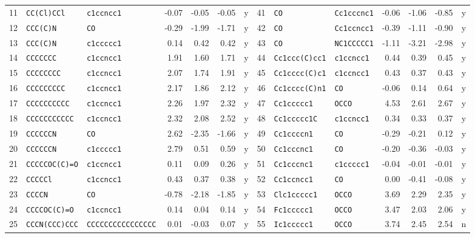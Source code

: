 \begin{table}[t]
{\begin{tabular}{@{}rllrrrc@{\hspace{1.2em}}rllrrrc@{}}
11 & \texttt{CC(Cl)CCl} & \texttt{c1ccncc1} & -0.07 & -0.05 & -0.05 & y & 41 & \texttt{CO} & \texttt{Cc1cccnc1} & -0.06 & -1.06 & -0.85 & y \\
12 & \texttt{CCC(C)N} & \texttt{CO} & -0.29 & -1.99 & -1.71 & y & 42 & \texttt{CO} & \texttt{Cc1ccncc1} & -0.39 & -1.11 & -0.90 & y \\
13 & \texttt{CCC(C)N} & \texttt{c1ccccc1} & 0.14 & 0.42 & 0.42 & y & 43 & \texttt{CO} & \texttt{NC1CCCCC1} & -1.11 & -3.21 & -2.98 & y \\
14 & \texttt{CCCCCCC} & \texttt{c1ccncc1} & 1.91 & 1.60 & 1.71 & y & 44 & \texttt{Cc1ccc(C)cc1} & \texttt{c1ccncc1} & 0.44 & 0.39 & 0.45 & y \\
15 & \texttt{CCCCCCCC} & \texttt{c1ccncc1} & 2.07 & 1.74 & 1.91 & y & 45 & \texttt{Cc1cccc(C)c1} & \texttt{c1ccncc1} & 0.43 & 0.37 & 0.43 & y \\
16 & \texttt{CCCCCCCCC} & \texttt{c1ccncc1} & 2.17 & 1.86 & 2.12 & y & 46 & \texttt{Cc1cccc(C)n1} & \texttt{CO} & -0.06 & 0.14 & 0.64 & y \\
17 & \texttt{CCCCCCCCCC} & \texttt{c1ccncc1} & 2.26 & 1.97 & 2.32 & y & 47 & \texttt{Cc1ccccc1} & \texttt{OCCO} & 4.53 & 2.61 & 2.67 & y \\
18 & \texttt{CCCCCCCCCCC} & \texttt{c1ccncc1} & 2.32 & 2.08 & 2.52 & y & 48 & \texttt{Cc1ccccc1C} & \texttt{c1ccncc1} & 0.34 & 0.33 & 0.37 & y \\
19 & \texttt{CCCCCCN} & \texttt{CO} & 2.62 & -2.35 & -1.66 & y & 49 & \texttt{Cc1ccccn1} & \texttt{CO} & -0.29 & -0.21 & 0.12 & y \\
20 & \texttt{CCCCCCN} & \texttt{c1ccccc1} & 2.79 & 0.51 & 0.59 & y & 50 & \texttt{Cc1cccnc1} & \texttt{CO} & -0.20 & -0.36 & -0.03 & y \\
21 & \texttt{CCCCCOC(C)=O} & \texttt{c1ccncc1} & 0.11 & 0.09 & 0.26 & y & 51 & \texttt{Cc1cccnc1} & \texttt{c1ccccc1} & -0.04 & -0.01 & -0.01 & y \\
22 & \texttt{CCCCCl} & \texttt{c1ccncc1} & 0.43 & 0.37 & 0.38 & y & 52 & \texttt{Cc1ccncc1} & \texttt{CO} & 0.00 & -0.41 & -0.08 & y \\
23 & \texttt{CCCCN} & \texttt{CO} & -0.78 & -2.18 & -1.85 & y & 53 & \texttt{Clc1ccccc1} & \texttt{OCCO} & 3.69 & 2.29 & 2.35 & y \\
24 & \texttt{CCCCOC(C)=O} & \texttt{c1ccncc1} & 0.14 & 0.04 & 0.14 & y & 54 & \texttt{Fc1ccccc1} & \texttt{OCCO} & 3.47 & 2.03 & 2.06 & y \\
25 & \texttt{CCCN(CCC)CCC} & \texttt{CCCCCCCCCCCCCCCC} & 0.01 & -0.03 & 0.07 & y & 55 & \texttt{Ic1ccccc1} & \texttt{OCCO} & 3.74 & 2.45 & 2.54 & n \\

\end{tabular}}
\end{table}
